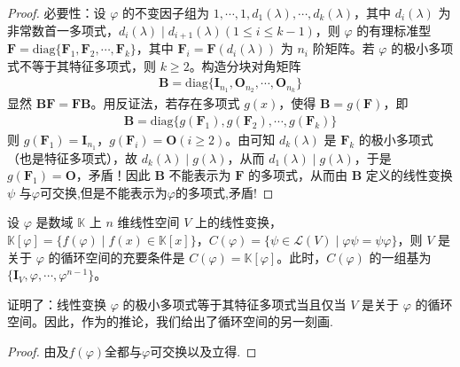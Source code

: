 \documentclass[../../main.tex]{subfiles}
\begin{document}
\begin{proof}
{\heiti 必要性：}设 $\varphi$ 的不变因子组为 $1,\cdots,1,d_1(\lambda),\cdots,d_k(\lambda)$，其中 $d_i(\lambda)$ 为非常数首一多项式，$d_i(\lambda)\mid d_{i + 1}(\lambda) (1\leqslant  i\leqslant  k - 1)$，则 $\varphi$ 的有理标准型 $\boldsymbol{F}=\mathrm{diag}\{\boldsymbol{F}_1,\boldsymbol{F}_2,\cdots,\boldsymbol{F}_k\}$，其中 $\boldsymbol{F}_i = \boldsymbol{F}(d_i(\lambda))$ 为 $n_i$ 阶矩阵。若 $\varphi$ 的极小多项式不等于其特征多项式，则 $k\geqslant  2$。构造分块对角矩阵
\begin{align*}
\boldsymbol{B}=\mathrm{diag}\{\boldsymbol{I}_{n_1},\boldsymbol{O}_{n_2},\cdots,\boldsymbol{O}_{n_k}\}
\end{align*}
显然 $\boldsymbol{BF}=\boldsymbol{FB}$。用反证法，若存在多项式 $g(x)$，使得 $\boldsymbol{B}=g(\boldsymbol{F})$，即
\begin{align*}
\boldsymbol{B}=\mathrm{diag}\{g(\boldsymbol{F}_1),g(\boldsymbol{F}_2),\cdots,g(\boldsymbol{F}_k)\}
\end{align*}
则 $g(\boldsymbol{F}_1)=\boldsymbol{I}_{n_1}$，$g(\boldsymbol{F}_i)=\boldsymbol{O}(i\geqslant  2)$。由可知 $d_k(\lambda)$ 是 $\boldsymbol{F}_k$ 的极小多项式（也是特征多项式），故 $d_k(\lambda)\mid g(\lambda)$，从而 $d_1(\lambda)\mid g(\lambda)$，于是 $g(\boldsymbol{F}_1)=\boldsymbol{O}$，矛盾！因此 $\boldsymbol{B}$ 不能表示为 $\boldsymbol{F}$ 的多项式，从而由 $\boldsymbol{B}$ 定义的线性变换 $\psi$ 与$\varphi$可交换,但是不能表示为$\varphi$的多项式,矛盾!
\end{proof}

\begin{corollary}\label{corollary:循环子空间的另一种刻画}
设 $\varphi$ 是数域 $\mathbb{K}$ 上 $n$ 维线性空间 $V$ 上的线性变换，$\mathbb{K}[\varphi]=\{f(\varphi)\mid f(x)\in\mathbb{K}[x]\}$，$C(\varphi)=\{\psi\in\mathcal{L}(V)\mid\varphi\psi = \psi\varphi\}$，则 $V$ 是关于 $\varphi$ 的循环空间的充要条件是 $C(\varphi)=\mathbb{K}[\varphi]$。此时，$C(\varphi)$ 的一组基为 $\{\boldsymbol{I}_V,\varphi,\cdots,\varphi^{n - 1}\}$。 
\end{corollary}
\begin{note}
证明了：线性变换 $\varphi$ 的极小多项式等于其特征多项式当且仅当 $V$ 是关于 $\varphi$ 的循环空间。因此，作为的推论，我们给出了循环空间的另一刻画.
\end{note}
\begin{proof}
由及$f(\varphi)$全都与$\varphi$可交换以及立得.
\end{proof}
\end{document}
